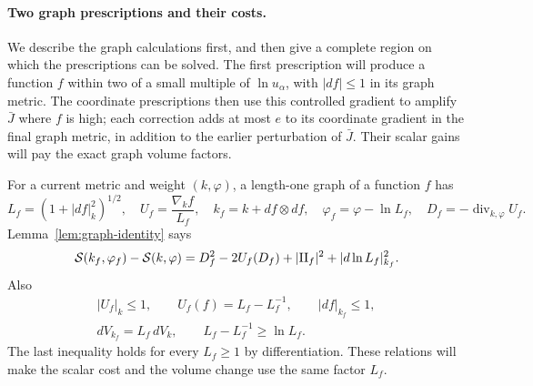 \paragraph{Two graph prescriptions and their costs.}
We describe the graph calculations first, and then give a complete region
on which the prescriptions can be solved.  The first prescription will
produce a function $f$ within two of a small multiple of $\ln u_\alpha$,
with $|df|\le1$ in its graph metric.  The coordinate prescriptions then
use this controlled gradient to amplify $\bar J$ where $f$ is high;
each correction adds at most $e$ to its coordinate gradient in the final
graph metric, in addition to the earlier perturbation of $\bar J$.
Their scalar gains will pay the exact graph volume factors.

For a current metric and
weight $(k,\varphi)$, a length-one graph of a function $f$ has
\[
 L_f=(1+|df|_k^2)^{1/2},\quad U_f=\frac{\nabla_k f}{L_f},\quad
 k_f=k+df\otimes df,\quad \varphi_f=\varphi-\ln L_f,
 \quad D_f=-\operatorname{div}_{k,\varphi}U_f.
\]
Lemma~\ref{lem:graph-identity} says
\begin{equation}\label{eq:degree-graph-identity}
 \mathcal S(k_f,\varphi_f)-\mathcal S(k,\varphi)
    =D_f^2-2U_f(D_f)+|\mathrm{II}_f|^2+|d\ln L_f|_{k_f}^2.
\end{equation}
Also
\begin{equation}\label{eq:degree-graph-elementary}
 \begin{gathered}
 |U_f|_k\le1,\qquad U_f(f)=L_f-L_f^{-1},\qquad
 |df|_{k_f}\le1,\\
 dV_{k_f}=L_f\,dV_k,\qquad L_f-L_f^{-1}\ge\ln L_f.
 \end{gathered}
\end{equation}
The last inequality holds for every $L_f\ge1$ by differentiation.  These
relations will make the scalar cost and the volume change use the same
factor $L_f$.

